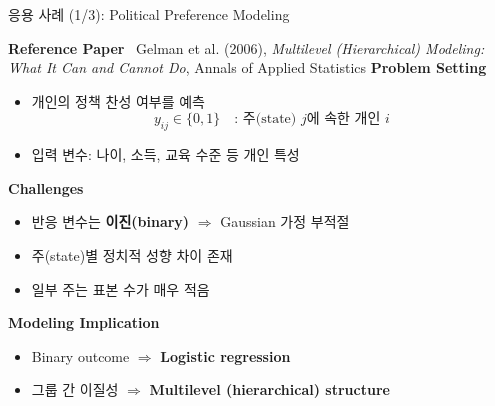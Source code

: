\documentclass[xcolor=dvipsnames,t,9pt]{beamer}
\begin{document}
\begin{frame}{응용 사례 (1/3): Political Preference Modeling}

    \textbf{Reference Paper} \, Gelman et al. (2006), \emph{Multilevel (Hierarchical) Modeling: What It Can and Cannot Do}, Annals of Applied Statistics
    \vfill
    \textbf{Problem Setting}
    \begin{itemize}
        \item 개인의 정책 찬성 여부를 예측
        \[
        y_{ij} \in \{0,1\} \quad \text{: 주(state) } j \text{에 속한 개인 } i
        \]
        \item 입력 변수: 나이, 소득, 교육 수준 등 개인 특성
    \end{itemize}
    \vfill
    \textbf{Challenges}
    \begin{itemize}
        \item 반응 변수는 \textbf{이진(binary)} $\Rightarrow$ Gaussian 가정 부적절
        \item 주(state)별 정치적 성향 차이 존재
        \item 일부 주는 표본 수가 매우 적음
    \end{itemize}
    \vfill
    \textbf{Modeling Implication}
    \begin{itemize}
        \item Binary outcome $\Rightarrow$ \textbf{Logistic regression}
        \item 그룹 간 이질성 $\Rightarrow$ \textbf{Multilevel (hierarchical) structure}
    \end{itemize}
    
\end{frame}

\end{document}
